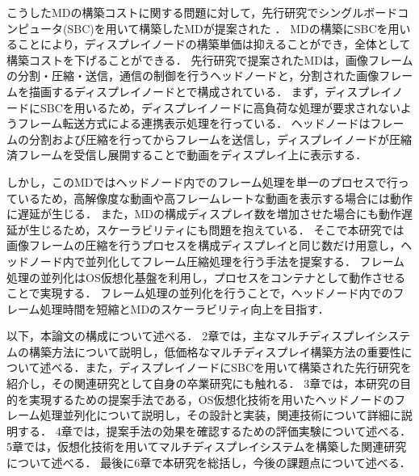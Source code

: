 こうしたMDの構築コストに関する問題に対して，先行研究でシングルボードコンピュータ(SBC)を用いて構築したMDが提案された \cite{sbcmultidisplay}．
MDの構築にSBCを用いることにより，ディスプレイノードの構築単価は抑えることができ，全体として構築コストを下げることができる．
先行研究で提案されたMDは，画像フレームの分割・圧縮・送信，通信の制御を行うヘッドノードと，分割された画像フレームを描画するディスプレイノードとで構成されている．
まず，ディスプレイノードにSBCを用いるため，ディスプレイノードに高負荷な処理が要求されないようフレーム転送方式による連携表示処理を行っている．
ヘッドノードはフレームの分割および圧縮を行ってからフレームを送信し，ディスプレイノードが圧縮済フレームを受信し展開することで動画をディスプレイ上に表示する．

しかし，このMDではヘッドノード内でのフレーム処理を単一のプロセスで行っているため，高解像度な動画や高フレームレートな動画を表示する場合には動作に遅延が生じる．
また，MDの構成ディスプレイ数を増加させた場合にも動作遅延が生じるため，スケーラビリティにも問題を抱えている．
そこで本研究では画像フレームの圧縮を行うプロセスを構成ディスプレイと同じ数だけ用意し，ヘッドノード内で並列化してフレーム圧縮処理を行う手法を提案する．
フレーム処理の並列化はOS仮想化基盤を利用し，プロセスをコンテナとして動作させることで実現する．
フレーム処理の並列化を行うことで，ヘッドノード内でのフレーム処理時間を短縮とMDのスケーラビリティ向上を目指す．

以下，本論文の構成について述べる．
2章では，主なマルチディスプレイシステムの構築方法について説明し，低価格なマルチディスプレイ構築方法の重要性について述べる．また，ディスプレイノードにSBCを用いて構築された先行研究を紹介し，その関連研究として自身の卒業研究にも触れる．
3章では，本研究の目的を実現するための提案手法である，OS仮想化技術を用いたヘッドノードのフレーム処理並列化について説明し，その設計と実装，関連技術について詳細に説明する．
4章では，提案手法の効果を確認するための評価実験について述べる．
5章では，仮想化技術を用いてマルチディスプレイシステムを構築した関連研究について述べる．
最後に6章で本研究を総括し，今後の課題点について述べる．